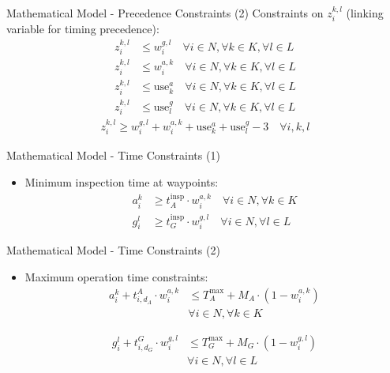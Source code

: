 \documentclass[aspectratio=169,11pt,xcolor={dvipsnames},hyperref={pdftex,pdfpagemode=UseNone,hidelinks,pdfdisplaydoctitle=true},usepdftitle=false]{beamer}
\begin{document}
  \begin{frame}{Mathematical Model - Precedence Constraints (2)}
    Constraints on $z_i^{k,l}$ (linking variable for timing precedence):
    \begin{align}
      z_i^{k,l} &\leq w_i^{g,l} \quad \forall i \in N, \forall k \in K, \forall l \in L\\
      z_i^{k,l} &\leq w_i^{a,k} \quad \forall i \in N, \forall k \in K, \forall l \in L\\
      z_i^{k,l} &\leq \text{use}_k^a \quad \forall i \in N, \forall k \in K, \forall l \in L\\
      z_i^{k,l} &\leq \text{use}_l^g \quad \forall i \in N, \forall k \in K, \forall l \in L
    \end{align}
    \begin{align}
      z_i^{k,l} \geq w_i^{g,l} + w_i^{a,k} + \text{use}_k^a + \text{use}_l^g - 3 \quad \forall i, k, l
    \end{align}
  \end{frame}

  \begin{frame}{Mathematical Model - Time Constraints (1)}
    \begin{itemize}
      \item Minimum inspection time at waypoints:
      \begin{align}
        a_i^k &\geq t_A^{\text{insp}} \cdot w_i^{a,k} \quad \forall i \in N, \forall k \in K\\
        g_i^l &\geq t_G^{\text{insp}} \cdot w_i^{g,l} \quad \forall i \in N, \forall l \in L
      \end{align}
    \end{itemize}
  \end{frame}

  \begin{frame}{Mathematical Model - Time Constraints (2)}
    \begin{itemize}
      \item Maximum operation time constraints:
      \begin{align}
        a_i^k + t_{i,d_A}^{A} \cdot w_i^{a,k} &\leq T_A^{\max} + M_A \cdot (1 - w_i^{a,k}) \\
        &\forall i \in N, \forall k \in K
      \end{align}
      
      \begin{align}
        g_i^l + t_{i,d_G}^{G} \cdot w_i^{g,l} &\leq T_G^{\max} + M_G \cdot (1 - w_i^{g,l}) \\
        &\forall i \in N, \forall l \in L
      \end{align}
    \end{itemize}
  \end{frame}
\end{document}
